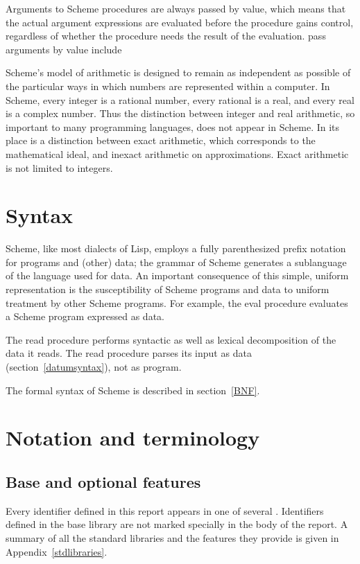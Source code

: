 \vest Arguments to Scheme procedures are always passed by value, which
means that the actual argument expressions are evaluated before the
procedure gains control, regardless of whether the procedure needs the
result of the evaluation.  
pass arguments by value include

\vest Scheme's model of arithmetic is designed to remain as independent as
possible of the particular ways in which numbers are represented within a
computer. In Scheme, every integer is a rational number, every rational is a
real, and every real is a complex number.  Thus the distinction between integer
and real arithmetic, so important to many programming languages, does not
appear in Scheme.  In its place is a distinction between exact arithmetic,
which corresponds to the mathematical ideal, and inexact arithmetic on
approximations.  Exact arithmetic is not limited to integers.

\section{Syntax}

Scheme, like most dialects of Lisp, employs a fully parenthesized prefix
notation for programs and (other) data; the grammar of Scheme generates a
sublanguage of the language used for data.  An important
consequence of this simple, uniform representation is the susceptibility of
Scheme programs and data to uniform treatment by other Scheme programs.
For example, the {\cf eval} procedure evaluates a Scheme program expressed
as data.

The {\cf read} procedure performs syntactic as well as lexical decomposition of
the data it reads.  The {\cf read} procedure parses its input as data
(section~\ref{datumsyntax}), not as program.

The formal syntax of Scheme is described in section~\ref{BNF}.


\section{Notation and terminology}


\subsection{Base and optional features}
\label{qualifiers}

Every identifier defined in this report appears in one of several
.  Identifiers defined in the {\cf base} library
are not marked specially in the body of the report.  A summary of
all the standard libraries and the features they provide is given in
Appendix~\ref{stdlibraries}.


